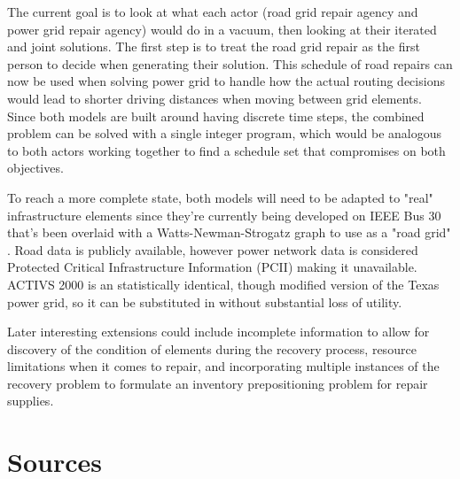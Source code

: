 \documentclass{article}
\begin{document}
	The current goal is to look at what each actor (road grid repair agency and power grid repair agency) would do in a vacuum, then looking at their iterated and joint solutions. The first step is to treat the road grid repair as the first person to decide when generating their solution. This schedule of road repairs can now be used when solving power grid to handle how the actual routing decisions would lead to shorter driving distances when moving between grid elements. Since both models are built around having discrete time steps, the combined problem can be solved with a single integer program, which would be analogous to both actors working together to find a schedule set that compromises on both objectives.
	
	To reach a more complete state, both models will need to be adapted to "real" infrastructure elements since they're currently being developed on IEEE Bus 30 that's been overlaid with a Watts-Newman-Strogatz graph to use as a "road grid"\cite{Newman2000} \cite{WattsEA1998}. Road data is publicly available, however power network data is considered Protected Critical Infrastructure Information (PCII) making it unavailable. ACTIVS 2000 is an statistically identical, though modified version of the Texas power grid, so it can be substituted in without substantial loss of utility.
	
	Later interesting extensions could include incomplete information to allow for discovery of the condition of elements during the recovery process, resource limitations when it comes to repair, and incorporating multiple instances of the recovery problem to formulate an inventory prepositioning problem for repair supplies.
	\section{Sources}
	\printbibliography
\end{document}

